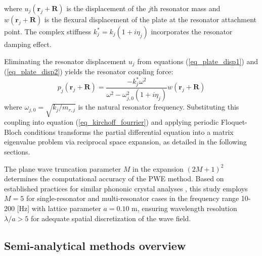 \documentclass[review,numbers,sort&compress]{elsarticle}
\begin{document}
where \( u_j(\mathbf{r}_j + \mathbf{R}) \) is the displacement of the \( j \)th resonator mass and \( w(\mathbf{r}_j + \mathbf{R}) \) is the flexural displacement of the plate at the resonator attachment point. The complex stiffness \( k_j^* = k_j(1 + i\eta_j) \) incorporates the resonator damping effect.

Eliminating the resonator displacement $u_j$ from equations (\ref{eq_plate_disp1}) and (\ref{eq_plate_disp2}) yields the resonator coupling force:
\begin{equation}
p_j(\mathbf{r}_j + \mathbf{R}) = \frac{-k_j^* \omega^2}{\omega^2 - \omega_{j,0}^2(1 + i\eta_j)} w(\mathbf{r}_j + \mathbf{R})
\label{eq:resonator_coupling}
\end{equation}
where $\omega_{j,0} = \sqrt{k_j/m_{r,j}}$ is the natural resonator frequency. Substituting this coupling into equation (\ref{eq_kirchoff_fourrier}) and applying periodic Floquet-Bloch conditions transforms the partial differential equation into a matrix eigenvalue problem via reciprocal space expansion, as detailed in the following sections.

The plane wave truncation parameter $M$ in the expansion $(2M+1)^2$ determines the computational accuracy of the PWE method. Based on established practices for similar phononic crystal analyses \cite{Phani2006, Laude2009}, this study employs $M = 5$ for single-resonator and multi-resonator cases in the frequency range 10-200 [Hz] with lattice parameter $a = 0.10$ m, ensuring wavelength resolution $\lambda/a > 5$ for adequate spatial discretization of the wave field.

\subsection{Semi-analytical methods overview}\label{methods_overview}
\end{document}

